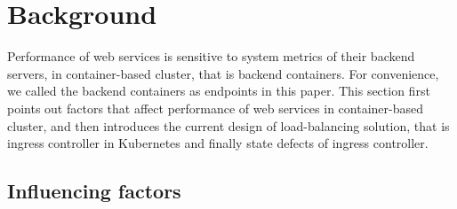 \section{Background}
\label{sec:background}

Performance of web services is sensitive to system metrics of their backend servers, in container-based cluster, that is backend containers. For convenience, we called the backend containers as endpoints in this paper. This section first points out factors that affect performance of web services in container-based cluster, and then introduces the current design of load-balancing solution, that is ingress controller in Kubernetes and finally state defects of ingress controller.

\subsection{Influencing factors}
\label{subsec:Influencing_factors}

